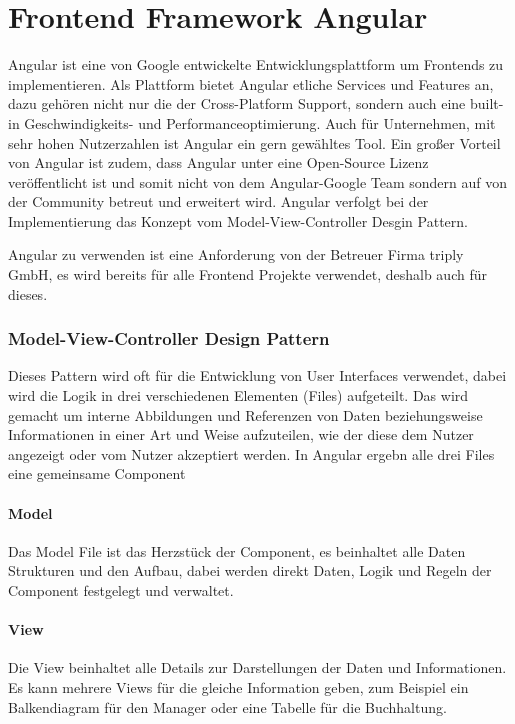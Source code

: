 \section{Frontend Framework Angular}
Angular ist eine von Google entwickelte Entwicklungsplattform um Frontends zu implementieren.
Als Plattform bietet Angular etliche Services und Features an, dazu gehören nicht nur die der Cross-Platform Support,
sondern auch eine built-in Geschwindigkeits- und Performanceoptimierung. Auch für Unternehmen, mit sehr hohen Nutzerzahlen
ist Angular ein gern gewähltes Tool. Ein großer Vorteil von Angular ist zudem, dass Angular unter eine Open-Source Lizenz veröffentlicht
ist und somit nicht von dem Angular-Google Team sondern auf von der Community betreut und erweitert wird.
Angular verfolgt bei der Implementierung das Konzept vom Model-View-Controller Desgin Pattern.

Angular zu verwenden ist eine Anforderung von der Betreuer Firma triply GmbH, es wird bereits für alle Frontend Projekte verwendet,
deshalb auch für dieses.

\subsubsection{Model-View-Controller Design Pattern}
Dieses Pattern wird oft für die Entwicklung von User Interfaces verwendet,
dabei wird die Logik in drei verschiedenen Elementen (Files) aufgeteilt. Das wird
gemacht um interne Abbildungen und Referenzen von Daten beziehungsweise Informationen
in einer Art und Weise aufzuteilen, wie der diese dem Nutzer angezeigt oder vom 
Nutzer akzeptiert werden. In Angular ergebn alle drei Files eine gemeinsame Component

\paragraph{Model}
Das Model File ist das Herzstück der Component, es beinhaltet alle Daten
Strukturen und den Aufbau, dabei werden direkt Daten, Logik und Regeln
der Component festgelegt und verwaltet.

\paragraph{View}
Die View beinhaltet alle Details zur Darstellungen der Daten und Informationen.
Es kann mehrere Views für die gleiche Information geben, zum Beispiel ein
Balkendiagram für den Manager oder eine Tabelle für die Buchhaltung.

